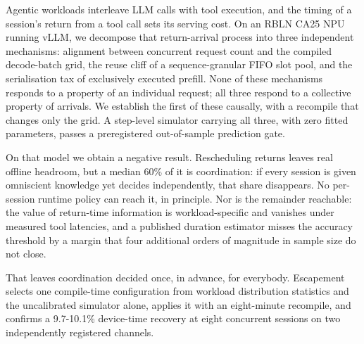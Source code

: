 Agentic workloads interleave LLM calls with tool execution, and the timing of a session's return from a tool call sets its serving cost. On an RBLN CA25 NPU running vLLM, we decompose that return-arrival process into three independent mechanisms: alignment between concurrent request count and the compiled decode-batch grid, the reuse cliff of a sequence-granular FIFO slot pool, and the serialisation tax of exclusively executed prefill. None of these mechanisms responds to a property of an individual request; all three respond to a collective property of arrivals. We establish the first of these causally, with a recompile that changes only the grid. A step-level simulator carrying all three, with zero fitted parameters, passes a preregistered out-of-sample prediction gate.

On that model we obtain a negative result. Rescheduling returns leaves real offline headroom, but a median 60\% of it is coordination: if every session is given omniscient knowledge yet decides independently, that share disappears. No per-session runtime policy can reach it, in principle. Nor is the remainder reachable: the value of return-time information is workload-specific and vanishes under measured tool latencies, and a published duration estimator misses the accuracy threshold by a margin that four additional orders of magnitude in sample size do not close.

That leaves coordination decided once, in advance, for everybody. Escapement selects one compile-time configuration from workload distribution statistics and the uncalibrated simulator alone, applies it with an eight-minute recompile, and confirms a 9.7-10.1\% device-time recovery at eight concurrent sessions on two independently registered channels.
